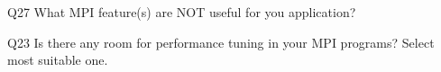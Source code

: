 \begin{description}%
\item{Q27} What MPI feature(s) are NOT useful for you application?%
\item{Q23} Is there any room for performance tuning in your MPI programs? Select most suitable one.%
\end{description}%
